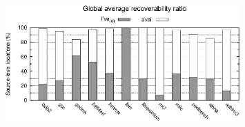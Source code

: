 \begin{figure}[!ht]
\begin{center}
\includegraphics[width=0.8\textwidth]{figures/CS-debug-ratio/CS-debug-ratio.eps}
\caption{\protect}
\end{center}
\end{figure}


